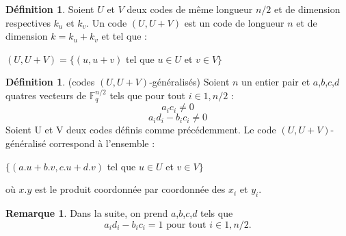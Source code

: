 \documentclass[12pt]{article}
\theoremstyle{definition}
\newtheorem{remarque}[thm]{Remarque}
\newtheorem{defi}[thm]{Définition}
\newcommand{\F}{\mathbb{F}}
\begin{document}
\begin{defi} Soient $U$ et $V$ deux codes de même longueur $n/2$ et de dimension respectives $k_u$ et $k_v$. Un code $(U,U+V)$ est un code de longueur $n$ et de dimension $k=k_u+k_v$ et tel que :
\begin{center}
$(U,U+V) = \{(u,u+v)$ tel que $u \in U$ et $v \in V \}$
\end{center}
\end{defi}

\begin{defi} (codes $(U,U+V)$-généralisés) Soient $n$ un entier pair et $a$,$b$,$c$,$d$ quatres vecteurs de $\F_q^{n/2}$ tels que pour tout $i \in {1,n/2}$ :
$$ a_ic_i \neq 0 $$
$$ a_id_i - b_ic_i \neq 0 $$
Soient U et V deux codes définis comme précédemment. Le code $(U,U+V)$-généralisé correspond à l'ensemble :
\begin{center}
$\{(a.u + b.v, c.u + d.v)$ tel que $u \in U$ et $v \in V \}$
\end{center}
où $x.y$ est le produit coordonnée par coordonnée des $x_i$ et $y_i$.
\end{defi}

\begin{remarque}
Dans la suite, on prend $a$,$b$,$c$,$d$ tels que 
$$ a_id_i - b_ic_i = 1 \text{ pour tout } i \in {1,n/2}.$$ 
\end{remarque}
\end{document}
